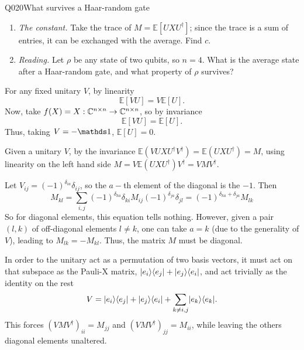 \begin{entry}{Q020}{What survives a Haar-random gate}
\begin{problem}
\begin{enumerate}[label=\textbf{(\alph*)},leftmargin=*]
  \item \emph{The constant.} Take the trace of $M=\mathbb E[UXU^{\dagger}]$; since the
        trace is a sum of entries, it can be exchanged with the average. Find $c$.

  \item \emph{Reading.} Let $\rho$ be any state of two qubits, so $n=4$. What is the
        average state after a Haar-random gate, and what property of $\rho$ survives?
\end{enumerate}
\end{problem}


\begin{solution}[Part (a)]
For any fixed unitary $V$, by linearity
\begin{equation*}
    \mathbb E[VU] = V\mathbb E[U].
\end{equation*}
Now, take $f(X)=X: \mathbb{C}^{n\times n} \rightarrow \mathbb{C}^{n\times n}$, so by invariance
\begin{equation*}
    \mathbb E[VU] = \mathbb E[U].
\end{equation*}
Thus, taking $V=-\id$, $ \mathbb E[U]=0$.

\end{solution}

\begin{solution}[Part (b)]
Given a unitary $V$, by the invariance $\mathbb E(VUXU^\dagger V^\dagger)=\mathbb E(UXU^\dagger)=M$, using linearity on the left hand side $M = V \mathbb E(UXU^\dagger)V^\dagger=V  MV^\dagger$.
\end{solution}

\begin{solution}[Part (c)]
Let $V_{ij}= (-1)^{\delta_{ia}}\delta_{ij}$, so the $a-$th element of the diagonal is the $-1$. Then
\begin{equation}
   M_{kl}= \sum_{i,j} (-1)^{\delta_{ka}}\delta_{ki}M_{ij} (-1)^{\delta_{ja}}\delta_{jl} = (-1)^{\delta_{ka}+\delta_{ja}} M_{lk}
\end{equation}
So for diagonal elements, this equation tells nothing. However, given a pair $(l,k)$ of off-diagonal elements $l\neq k$, one can take $a=k$ (due to the generality of $V$), leading to $M_{lk}=-M_{kl}$. Thus, the matrix $M$ must be diagonal.

In order to the unitary act as a permutation of two basis vectors, it must act on that subspace as the Pauli-X matrix, $ \lvert e_i \rangle\langle e_j \rvert + \lvert e_j \rangle\langle e_i \rvert$, and act trivially as the identity on the rest 
$$V=\lvert e_i \rangle\langle e_j \rvert + \lvert e_j \rangle\langle e_i \rvert+ \sum_{k\neq i,j} \lvert e_k \rangle\langle e_k \rvert.$$ 
This forces $(VMV^\dagger)_{ii}=M_{jj}$ and $(VMV^\dagger)_{jj}=M_{ii}$, while leaving the others diagonal elements unaltered. 


\end{solution}
\end{entry}
